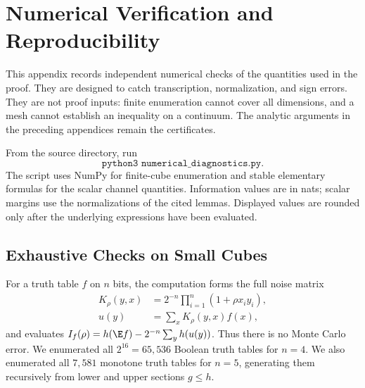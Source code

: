 \section{Numerical Verification and Reproducibility}
\label{app:numerical-diagnostics}

This appendix records independent numerical checks of the quantities used
in the proof. They are designed to catch transcription, normalization, and
sign errors. They are not proof inputs: finite enumeration cannot cover all
dimensions, and a mesh cannot establish an inequality on a continuum. The
analytic arguments in the preceding appendices remain the certificates.

\begin{remark}
From the source directory, run
\[
 \texttt{python3 numerical\_diagnostics.py}.
\]
The script uses NumPy for finite-cube enumeration and stable elementary
formulas for the scalar channel quantities. Information values are in
nats; scalar margins use the normalizations of the cited lemmas. Displayed
values are rounded only after the underlying expressions have been evaluated.
\end{remark}

\subsection{Exhaustive Checks on Small Cubes}

For a truth table \(f\) on \(n\) bits, the computation forms the full
noise matrix
\begin{align*}
 K_\rho(y,x)&=2^{-n}\prod_{i=1}^n(1+\rho x_i y_i),\\
 u(y)&=\sum_xK_\rho(y,x)f(x),
\end{align*}
and evaluates \(I_f(\rho)=h(\E f)-2^{-n}\sum_yh(u(y))\).
Thus there is no Monte Carlo error. We enumerated all \(2^{16}=65{,}536\)
Boolean truth tables for \(n=4\). We also enumerated all \(7{,}581\)
monotone truth tables for \(n=5\), generating them recursively from
lower and upper sections \(g\le h\).

